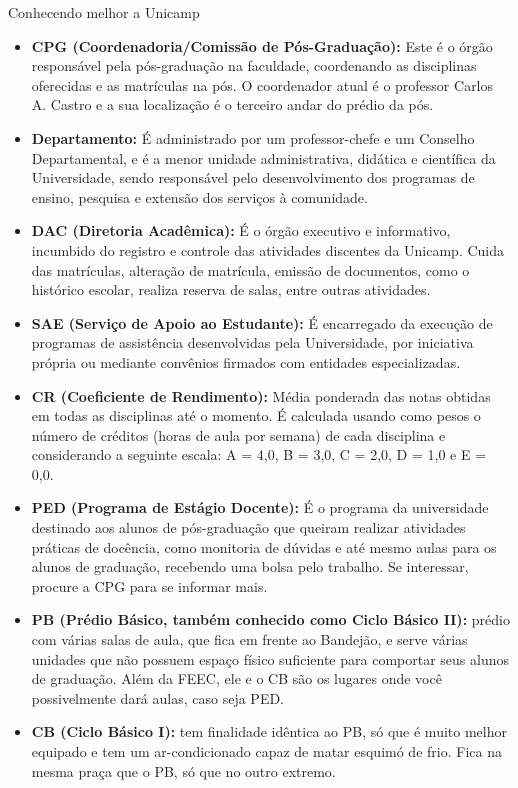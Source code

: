 \begin{story}{Conhecendo melhor a Unicamp}
\begin{itemize}
\item \textbf{CPG (Coordenadoria/Comissão de Pós-Graduação):} Este é o órgão responsável pela pós-graduação na faculdade, coordenando as disciplinas oferecidas e as matrículas na pós. O coordenador atual é o professor Carlos A. Castro e a sua localização é o terceiro andar do prédio da pós.

\item \textbf{Departamento:} É administrado por um professor-chefe e um Conselho Departamental, e é a menor unidade administrativa, didática e científica da Universidade, sendo responsável pelo desenvolvimento dos programas de ensino, pesquisa e extensão dos serviços à comunidade.

\item \textbf{DAC (Diretoria Acadêmica):} É o órgão executivo e informativo, incumbido do registro e controle das atividades discentes da Unicamp. Cuida das matrículas, alteração de matrícula, emissão de documentos, como o histórico escolar, realiza reserva de salas, entre outras atividades.

\item \textbf{SAE (Serviço de Apoio ao Estudante):} É encarregado da execução de programas de assistência desenvolvidas pela Universidade, por iniciativa própria ou mediante convênios firmados com entidades especializadas.

\item \textbf{CR (Coeficiente de Rendimento):} Média ponderada das notas obtidas em todas as disciplinas até o momento. É calculada usando como pesos o número de créditos (horas de aula por semana) de cada disciplina e considerando a seguinte escala: A = 4,0, B = 3,0, C = 2,0, D = 1,0 e E = 0,0.

\item \textbf{PED (Programa de Estágio Docente):} É o programa da universidade destinado aos alunos de pós-graduação que queiram realizar atividades práticas de docência, como monitoria de dúvidas e até mesmo aulas para os alunos de graduação, recebendo uma bolsa pelo trabalho. Se interessar, procure a CPG para se informar mais.

\item \textbf{PB (Prédio Básico, também conhecido como Ciclo Básico II):} prédio com várias salas de aula, que fica em frente ao Bandejão, e serve várias unidades que não possuem espaço físico suficiente para comportar seus alunos de graduação. Além da FEEC, ele e o CB são os lugares onde você possivelmente dará aulas, caso seja PED.

\item \textbf{CB (Ciclo Básico I):} tem finalidade idêntica ao PB, só que é muito melhor equipado e tem um ar-condicionado capaz de matar esquimó de frio. Fica na mesma praça que o PB, só que no outro extremo.
\end{itemize}

\end{story}


